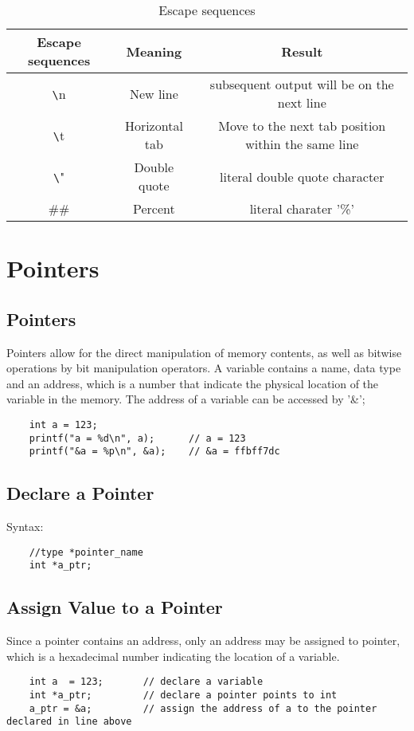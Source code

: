 \documentclass[12pt]{article} %
\begin{document}
\begin{table}[h]
    \centering
    \begin{tabular}{|c|c|c|}
    \hline
    Escape sequences & Meaning & Result \\ \hline
    \texttt{\textbackslash}n & New line & subsequent output will be on the next line \\ \hline
    \texttt{\textbackslash}t & Horizontal tab & Move to the next tab position within the same line \\ \hline
    \texttt{\textbackslash}" & Double quote & literal double quote character \\ \hline
    \#\# & Percent & literal charater '\%' \\ \hline

    \end{tabular}
    \caption{Escape sequences}
\end{table}

\section{Pointers}
\subsection{Pointers}
Pointers allow for the direct manipulation of memory contents, as well as bitwise operations by bit manipulation operators.
A variable contains a name, data type and an address, which is a number that indicate the physical location of the variable in the memory.
The address of a variable can be accessed by '\&';
\begin{lstlisting}
    int a = 123;
    printf("a = %d\n", a);      // a = 123
    printf("&a = %p\n", &a);    // &a = ffbff7dc
\end{lstlisting}

\subsection{Declare a Pointer}
Syntax:
\begin{lstlisting}
    //type *pointer_name
    int *a_ptr;
\end{lstlisting}
\subsection{Assign Value to a Pointer}
Since a pointer contains an address, only an address may be assigned to pointer, which is a hexadecimal number indicating the location of a variable.
\begin{lstlisting}
    int a  = 123;       // declare a variable
    int *a_ptr;         // declare a pointer points to int
    a_ptr = &a;         // assign the address of a to the pointer declared in line above
\end{lstlisting}
\end{document}
